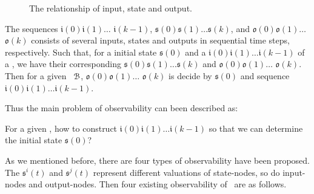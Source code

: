  \begin{figure}[thpb]
      \centering
      
      \caption{The relationship of input, state and output.}
      \label{fig:10}
  \end{figure}
   The sequences $\mathfrak{i}(0)$$\mathfrak{i}(1)\ldots$
$\mathfrak{i}(k-1)$,  $\mathfrak{s}(0) $$\mathfrak{s}(1)\ldots$$\mathfrak{s}(k)$, and $\mathfrak{o}(0)$$\mathfrak{o}(1)\ldots$$\mathfrak{o}(k)$ 
 consists of several inputs, states and outputs  in sequential time steps,  respectively. 
 Such that, for a initial state $\mathfrak{s}(0)$ and a $\mathfrak{i}(0)$$\mathfrak{i}(1)\ldots$$\mathfrak{i}(k-1)$ of a \BCN, we have their corresponding 
$\mathfrak{s}(0)$$\mathfrak{s}(1)\ldots $$\mathfrak{s}(k)$ and $\mathfrak{o}(0) $$\mathfrak{o}(1)\ldots$ $\mathfrak{o}(k)$.  
Then for a given  \BCN\  ${\mathcal{B}}$,  $\mathfrak{o}(0)$$\mathfrak{o}(1)\ldots$ $\mathfrak{o}(k)$ is decide by
$\mathfrak{s}(0)$ and sequence $\mathfrak{i}(0)$$\mathfrak{i}(1)\ldots$$\mathfrak{i}(k-1)$. 
 
 Thus the main problem of observability can been described as: 
\begin{problem}
\label{pro:1}
For a given  \BCN, how to construct $\mathfrak{i}(0)$$\mathfrak{i}(1)\ldots$$\mathfrak{i}(k-1)$ so that we can determine the initial state $\mathfrak{s}(0)$?
\end{problem}

As we mentioned before, there are four types of observability have been proposed. The $\mathfrak{s}^{i}(t)$ and $\mathfrak{s}^{j}(t)$ represent different valuations of state-nodes, so do input-nodes and output-nodes. Then four existing observability of \BCNs\ are as follows. 

